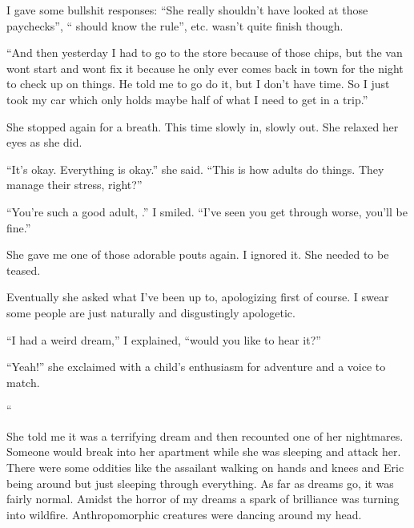 \noindent
I gave some bullshit responses:
``She really shouldn't have looked at those paychecks'',
``\jasmine{} should know the rule'', etc.
\april{} wasn't quite finish though.
\VV


``And then yesterday I had to go to the store because of those chips,
but the van wont start and \mike{} wont fix it because he only
ever comes back in town for the night to check up on things.
He told me to go do it, but I don't have time.  So I just took
my car which only holds maybe half of what I need to get in a trip.''
\VV

\noindent
She stopped again for a breath.  This time slowly in, slowly out.
She relaxed her eyes as she did.
\VV


\noindent
``It's okay. Everything is okay.'' she said.  ``This is how adults do things.
They manage their stress, right?''
\VV


``You're such a good adult, \april.''  I smiled.
``I've seen you get through worse, you'll be fine.''
\VV


\noindent
She gave me one of those adorable pouts again.  I ignored it.
She needed to be teased.
\VV


\noindent
Eventually she asked what I've been up to, apologizing first of course.
I swear some people are just naturally and disgustingly apologetic.
\VV


``I had a weird dream,'' I explained, ``would you like to hear it?''
\VV


``Yeah!'' she exclaimed with a child's enthusiasm for adventure and a
voice to match.
\vspace*{3ex}


\begin{adjustwidth}{2em}{2em}
\noindent\Huge``\normalsize
\begin{adjustwidth}{1em}{1em}

\end{adjustwidth}
\end{adjustwidth}
\VV


\noindent
She told me it was a terrifying dream and then recounted one of
her nightmares.  Someone would break into her apartment while she
was sleeping and attack her.  There were some oddities like
the assailant walking on hands and knees and Eric being around
but just sleeping through everything.  As far as dreams go,
it was fairly normal.
\lhoarb
\noindent
Amidst the horror of my dreams a spark of brilliance was turning into wildfire.
Anthropomorphic creatures were dancing around my head.
\lhoarb
